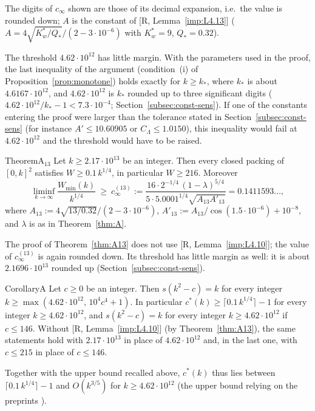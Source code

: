 \documentclass[11pt]{amsart}
\theoremstyle{definition}
\theoremstyle{remark}
\numberwithin{equation}{section}
\begin{document}
The digits of $c_\infty$ shown are those of its decimal expansion, i.e.\ the value is rounded down; $A$ is the constant
of [R, Lemma~\ref{imp:L4.13}] ($A=4\sqrt{K_w^*/Q_*}/(2-3\cdot10^{-6})$ with $K_w^*=9$, $Q_*=0.32$).

The threshold $4.62\cdot10^{12}$ has little margin. With the parameters used in the proof, the last inequality of the
argument (condition~(i) of Proposition~\ref{prop:monotone}) holds exactly for $k\ge k_*$, where $k_*$ is about
$4.6167\cdot10^{12}$, and $4.62\cdot10^{12}$ is $k_*$ rounded up to three significant digits
($4.62\cdot10^{12}/k_*-1<7.3\cdot10^{-4}$; Section~\ref{subsec:const-sens}). If one of the constants entering the proof were
larger than the tolerance stated in Section~\ref{subsec:const-sens} (for instance $A'\le10.60905$ or
$C_\Lambda\le1.0150$), this inequality would fail at $4.62\cdot10^{12}$ and the threshold would have to be raised.

\begin{IntroStatement}{Theorem}{A$_{13}$}\label{thm:A13}
Let $k\ge2.17\cdot10^{13}$ be an integer. Then every closed packing of $[0,k]^2$ satisfies $W\ge0.1\,k^{1/4}$, in
particular $W\ge216$. Moreover
\[
\liminf_{k\to\infty}\frac{W_{\min}(k)}{k^{1/4}}\ \ge\ c^{(13)}_\infty:=\frac{16\cdot2^{-1/4}\,(1-\lambda)^{5/4}}{5\cdot5.0001^{1/4}\sqrt{A_{13}A'_{13}}}
=0.1411593\ldots,
\]
where $A_{13}:=4\sqrt{13/0.32}/(2-3\cdot10^{-6})$, $A'_{13}:=A_{13}/\cos(1.5\cdot10^{-6})+10^{-8}$, and $\lambda$ is as in
Theorem~\ref{thm:A}.
\end{IntroStatement}

The proof of Theorem~\ref{thm:A13} does not use [R, Lemma~\ref{imp:L4.10}]; the value of $c^{(13)}_\infty$ is again rounded
down. Its threshold has little margin as well: it is about $2.1696\cdot10^{13}$ rounded up (Section~\ref{subsec:const-sens}).

\begin{IntroStatement}{Corollary}{A}\label{cor:A}
Let $c\ge0$ be an integer. Then $s(k^2-c)=k$ for every integer $k\ge\max(4.62\cdot10^{12},\,10^4c^4+1)$. In particular
$c^*(k)\ge\lceil0.1\,k^{1/4}\rceil-1$ for every integer $k\ge4.62\cdot10^{12}$, and $s(k^2-c)=k$ for every integer
$k\ge4.62\cdot10^{12}$ if $c\le146$. Without [R, Lemma~\ref{imp:L4.10}] (by Theorem~\ref{thm:A13}), the same statements
hold with $2.17\cdot10^{13}$ in place of $4.62\cdot10^{12}$ and, in the last one, with $c\le215$ in place of $c\le146$.
\end{IntroStatement}

Together with the upper bound recalled above, $c^*(k)$ thus lies between $\lceil0.1\,k^{1/4}\rceil-1$ and $O(k^{3/5})$
for $k\ge4.62\cdot10^{12}$ (the upper bound relying on the preprints \cite{Bui,McC}).
\end{document}
